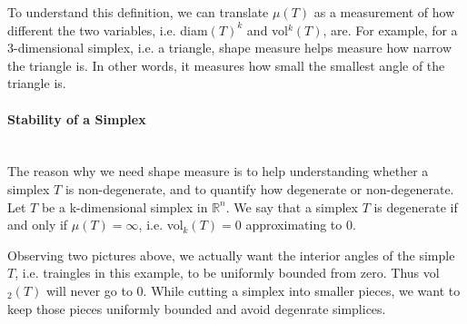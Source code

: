     To understand this definition, we can translate $\mu({{T}})$ as a measurement of how different the two variables, i.e. diam$({T})^k$ and vol$^k({T})$, are. For example, for a 3-dimensional simplex, i.e. a triangle, shape measure helps measure how narrow the triangle is. In other words, it measures how small the smallest angle of the triangle is. 

    \paragraph{Stability of a Simplex}\mbox{}\\
    The reason why we need shape measure is to help understanding whether a simplex $T$ is non-degenerate, and to quantify how degenerate or non-degenerate. Let $T$ be a k-dimensional simplex in $\mathbb{R}^n$. We say that a simplex $T$ is degenerate if and only if $\mu({T}) = \infty$, i.e. vol$_k(T) = 0$ approximating to 0.

    

    Observing two pictures above, we actually want the interior angles of the simple $T$, i.e. traingles in this example, to be uniformly bounded from zero. Thus vol$_2(T)$ will never go to 0.
    While cutting a simplex into smaller pieces, we want to keep those pieces uniformly bounded and avoid degenrate simplices. \\

